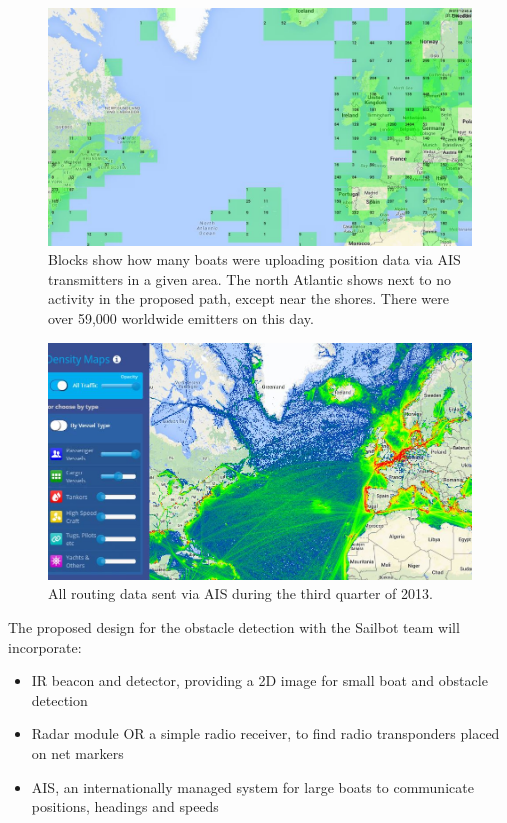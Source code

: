 \begin{figure}
\centering
\includegraphics[width=120mm,natwidth=540,natheight=459]{"./image/AIS_emitters_north_atlantic"}
\caption[All AIS emitters in the North Atlantic on Wednesday, November 26 2014.]{\label{fig:ais-emitters}Blocks show how many boats were uploading position data via AIS transmitters in a given area. The north Atlantic shows next to no activity in the proposed path, except near the shores. There were over 59,000 worldwide emitters on this day.}
\end{figure}

\begin{figure}
\centering
\includegraphics[width=120mm,natwidth=540,natheight=459]{"./image/AIS-tracking-Q3-2013"}
\caption[AIS- captured tracking data for Q3 2013]{\label{fig:ais-emitters-amortized}All routing data sent via AIS during the third quarter of 2013.}
\end{figure}

The proposed design for the obstacle detection with the Sailbot team will incorporate:
\begin{itemize}
\item IR beacon and detector, providing a 2D image for small boat and obstacle detection
\item Radar module OR a simple radio receiver, to find radio transponders placed on net markers
\item AIS, an internationally managed system for large boats to communicate positions, headings and speeds
\end{itemize}

